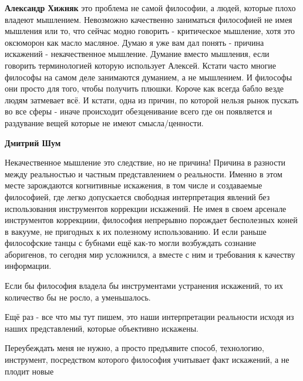 \begin{itemize}
\begin{itemize}
\textbf{Александр Хижняк} это проблема не самой философии, а людей, которые
плохо владеют мышлением. Невозможно качественно заниматься философией не имея
мышления или то, что сейчас модно говорить - критическое мышление, хотя это
оксюморон как масло масляное. Думаю я уже вам дал понять - причина искажений -
некачественное мышление. Думание вместо мышления, если говорить терминологией
которую использует Алексей. Кстати часто многие философы на самом деле
занимаются думанием, а не мышлением. И философы они просто для того, чтобы
получить плюшки. Короче как всегда бабло везде людям затмевает всё. И кстати,
одна из причин, по которой нельзя рынок пускать во все сферы - иначе происходит
обезценивание всего где он появляется и раздувание вещей которые не имеют
смысла/ценности.

 
\textbf{Дмитрий Шум} 

Некачественное мышление это следствие, но не причина! Причина в разности между
реальностью и частным представлением о реальности. Именно в этом месте
зарождаются когнитивные искажения, в том числе и создаваемые философией, где
легко допускается свободная интерпретация явлений без использования
инструментов коррекции искажений. Не имея в своем арсенале инструментов
коррекциии, философия непрерывно порождает бесполезных коней в вакууме, не
пригодных к их полезному использованию. И если раньше философские танцы с
бубнами ещё как-то могли возбуждать сознание аборигенов, то сегодня мир
усложнился, а вместе с ним и требования к качеству информации.

Если бы философия владела бы инструментами устранения искажений, то их
количество бы не росло, а уменьшалось.

Ещё раз - все что мы тут пишем, это наши интерпретации реальности исходя из
наших представлений, которые объективно искажены.

Переубеждать меня не нужно, а просто предъявите способ, технологию, инструмент,
посредством которого философия учитывает факт искажений, а не плодит новые

 

\end{itemize}
\end{itemize}
